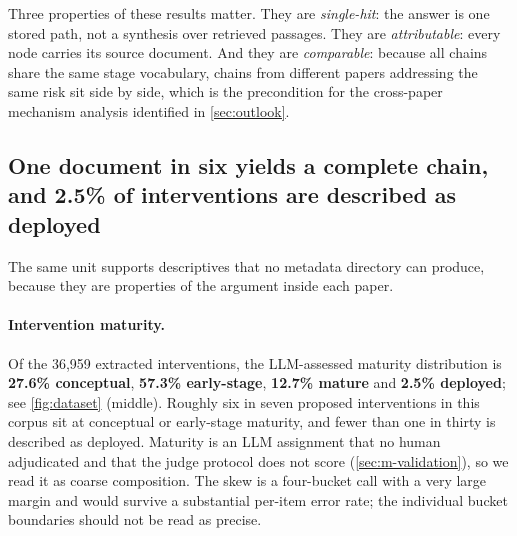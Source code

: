 \documentclass[10pt,twocolumn,letterpaper]{article}
\begin{document}
Three properties of these results matter. They are \emph{single-hit}: the answer is one
stored path, not a synthesis over retrieved passages. They are \emph{attributable}:
every node carries its source document. And they are \emph{comparable}: because all
chains share the same stage vocabulary, chains from different papers addressing the same
risk sit side by side, which is the precondition for the cross-paper mechanism analysis
identified in \cref{sec:outlook}.

\subsection{One document in six yields a complete chain, and 2.5\% of interventions are described as deployed}
\label{sec:r-corpus}

The same unit supports descriptives that no metadata directory can produce, because they
are properties of the argument inside each paper.

\paragraph{Intervention maturity.} Of the 36{,}959 extracted interventions, the
LLM-assessed maturity distribution is \textbf{27.6\% conceptual}, \textbf{57.3\%
early-stage}, \textbf{12.7\% mature} and \textbf{2.5\% deployed}; see \cref{fig:dataset}
(middle). Roughly six in seven
proposed interventions in this corpus sit at conceptual or early-stage maturity, and
fewer than one in thirty is described as deployed. Maturity is an LLM assignment that no
human adjudicated and that the judge protocol does not score (\cref{sec:m-validation}),
so we read it as coarse composition. The skew is a four-bucket call with a very large
margin and would survive a substantial per-item error rate; the individual bucket
boundaries should not be read as precise.
\end{document}
